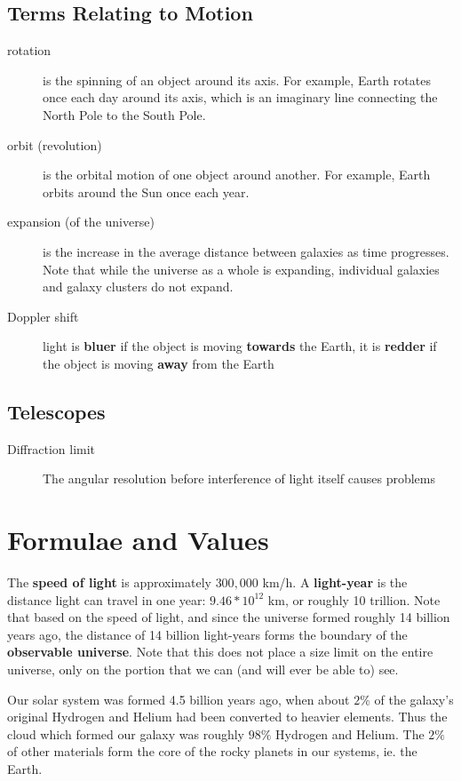 \documentclass[12pt]{article}
\begin{document}
\subsection{Terms Relating to Motion}
\begin{description}
\item[rotation] is the spinning of an object around its axis. For example, Earth rotates once each day around its axis, which is an imaginary
line connecting the North Pole to the South Pole.
\item[orbit (revolution)] is the orbital motion of one object around another. For example, Earth orbits around the Sun once each year.
\item[expansion (of the universe)] is the increase in the average distance between galaxies as time progresses. Note that while the universe as a whole is expanding, individual galaxies and galaxy clusters do not expand.
    \item[Doppler shift] light is \textbf{bluer} if the object is moving \textbf{towards} the Earth, it is \textbf{redder} if the object is moving \textbf{away} from the Earth
\end{description}

\subsection{Telescopes}

\begin{description}
    \item[Diffraction limit] The angular resolution before interference of light itself causes problems
\end{description}

\section{Formulae and Values}
The {\bf speed of light} is approximately $300,000$ km/h. A {\bf light-year} is the distance light can travel in one year: $9.46 * 10^{12}$ km, or roughly 10 trillion. Note that based on the speed of light, and since the universe formed roughly 14 billion years ago, the distance of 14 billion light-years forms the boundary of the {\bf observable universe}. Note that this does not place a size limit on the entire universe, only on the portion that we can (and will ever be able to) see.

Our solar system was formed 4.5 billion years ago, when about $2\%$ of the galaxy's original Hydrogen and Helium had been converted to heavier elements. Thus the cloud which formed our galaxy was roughly $98\%$ Hydrogen and Helium. The $2\%$ of other materials form the core of the rocky planets in our systems, ie. the Earth.
\end{document}
